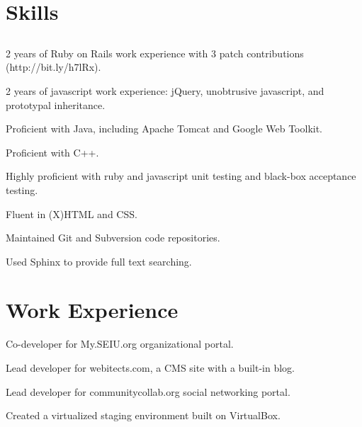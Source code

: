 \documentclass{resume}
\begin{document}
\author{Dmitry Ratnikov}
\maketitle

\section{Skills}

\subsection{}

\begin{compactitem}
  \item 2 years of Ruby on Rails work experience with 3 patch contributions (http://bit.ly/h7lRx).
  \item 2 years of javascript work experience: jQuery, unobtrusive javascript, and prototypal inheritance.
  \item Proficient with Java, including Apache Tomcat and Google Web Toolkit.
  \item Proficient with C++.
  \\
  \item Highly proficient with ruby and javascript unit testing and black-box acceptance testing.
  \item Fluent in (X)HTML and CSS.
  \item Maintained Git and Subversion code repositories.
  \item Used Sphinx to provide full text searching.
\end{compactitem}

\section{Work Experience}

\begin{compactitem}
  \item Co-developer for My.SEIU.org organizational portal.
  \item Lead developer for webitects.com, a CMS site with a built-in blog.
  \item Lead developer for communitycollab.org social networking portal.
  \item Created a virtualized staging environment built on VirtualBox.
\end{compactitem}
\end{document}
